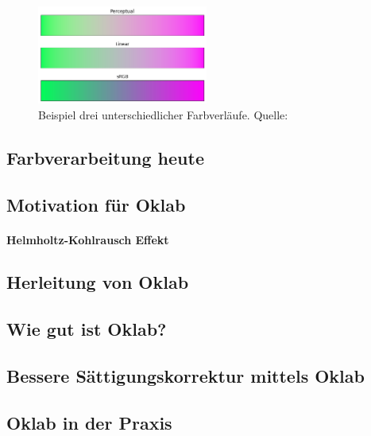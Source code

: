 \documentclass[12pt, a4paper, ngerman]{article}
\begin{document}
\begin{figure}
  \centering
  \includegraphics[width=0.5\textwidth]{Grafiken/vergleich_srgb.png}
  \caption{Beispiel drei unterschiedlicher Farbverläufe. Quelle: ~\cite{Ottosson_2020}}
  \label{fig:vergleich_srgb}
\end{figure}

\subsection{Farbverarbeitung heute}

\subsection{Motivation für Oklab}
\paragraph{Helmholtz-Kohlrausch Effekt}
\subsection{Herleitung von Oklab}
\subsection{Wie gut ist Oklab?}
\subsection{Bessere Sättigungskorrektur mittels Oklab}
\subsection{Oklab in der Praxis}

\printbibliography
\end{document}
